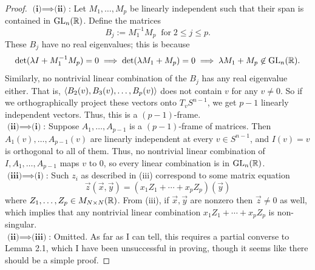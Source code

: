\documentclass{amsart}
\DeclareMathOperator{\Cl}{\mathrm{Cl}}
\begin{document}
\begin{proof}
	$\textbf{(i)}\implies \textbf{(ii)}$: Let $M_1,\dots,M_p$ be linearly independent such that their span is contained in $\operatorname{GL}_n(\mathbb{R})$. Define the matrices
	$$
	B_j := M_1^{-1}M_p \;\; \text{for} \; 2\leq j\leq p.
	$$
	These $B_j$ have no real eigenvalues; this is because 
	$$
	\det(\lambda I + M_1^{-1}M_p) = 0 \implies \det(\lambda M_1 + M_p) = 0 \implies \lambda M_1 + M_p \not\in \operatorname{GL}_n(\mathbb{R}).
	$$
	Similarly, no nontrivial linear combination of the $B_j$ has any real eigenvalue either. That is, $\langle B_2(v),B_3(v),\dots,B_p(v)\rangle$ does not contain $v$ for any $v\neq 0$. So if we orthographically project these vectors onto $T_vS^{n-1}$, we get $p-1$ linearly independent vectors. Thus, this is a $(p-1)$-frame.\\
	
	$\textbf{(ii)}\implies \textbf{(i)}$: Suppose $A_1,\dots,A_{p-1}$ is a $(p-1)$-frame of matrices. Then $A_1(v),\dots,A_{p-1}(v)$ are linearly independent at every $v\in S^{n-1}$, and $I(v)=v$ is orthogonal to all of them. Thus, no nontrivial linear combination of $I,A_1,\dots,A_{p-1}$ maps $v$ to $0$, so every linear combination is in $\operatorname{GL}_n(\mathbb{R})$.\\
	
	$\textbf{(iii)}\implies \textbf{(i)}$: Such $z_i$ as described in (iii) correspond to some matrix equation
	$$
	\vec{z}(\vec{x},\vec{y}) = (x_1 Z_1 +\cdots + x_p Z_p)(\vec{y})
	$$
	where $Z_1,\dots,Z_p\in M_{N\times N}(\mathbb{R})$. From (iii), if $\vec{x},\vec{y}$ are nonzero then $\vec{z}\neq 0$ as well, which implies that any nontrivial linear combination $x_1Z_1+\cdots + x_pZ_p$ is non-singular.\\
	
	$\textbf{(ii)}\implies \textbf{(iii)}$: Omitted. As far as I can tell, this requires a partial converse to Lemma 2.1, which I have been unsuccessful in proving, though it seems like there should be a simple proof.
	
\end{proof}\\

\end{document}
